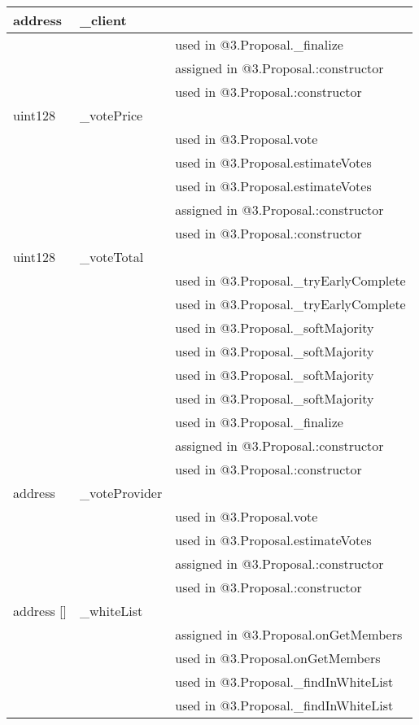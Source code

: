 \ifsoltables
\noindent\begin{tabular}{|l|l|p{5cm}|}\hline
address & \_{}client &  \\\hline
 & & used in @3.Proposal.\_{}finalize\\\hline
 & & assigned in @3.Proposal.:constructor\\\hline
 & & used in @3.Proposal.:constructor\\\hline
uint128 & \_{}votePrice &  \\\hline
 & & used in @3.Proposal.vote\\\hline
 & & used in @3.Proposal.estimateVotes\\\hline
 & & used in @3.Proposal.estimateVotes\\\hline
 & & assigned in @3.Proposal.:constructor\\\hline
 & & used in @3.Proposal.:constructor\\\hline
uint128 & \_{}voteTotal &  \\\hline
 & & used in @3.Proposal.\_{}tryEarlyComplete\\\hline
 & & used in @3.Proposal.\_{}tryEarlyComplete\\\hline
 & & used in @3.Proposal.\_{}softMajority\\\hline
 & & used in @3.Proposal.\_{}softMajority\\\hline
 & & used in @3.Proposal.\_{}softMajority\\\hline
 & & used in @3.Proposal.\_{}softMajority\\\hline
 & & used in @3.Proposal.\_{}finalize\\\hline
 & & assigned in @3.Proposal.:constructor\\\hline
 & & used in @3.Proposal.:constructor\\\hline
address & \_{}voteProvider &  \\\hline
 & & used in @3.Proposal.vote\\\hline
 & & used in @3.Proposal.estimateVotes\\\hline
 & & assigned in @3.Proposal.:constructor\\\hline
 & & used in @3.Proposal.:constructor\\\hline
address [] & \_{}whiteList &  \\\hline
 & & assigned in @3.Proposal.onGetMembers\\\hline
 & & used in @3.Proposal.onGetMembers\\\hline
 & & used in @3.Proposal.\_{}findInWhiteList\\\hline
 & & used in @3.Proposal.\_{}findInWhiteList\\\hline

\end{tabular}
